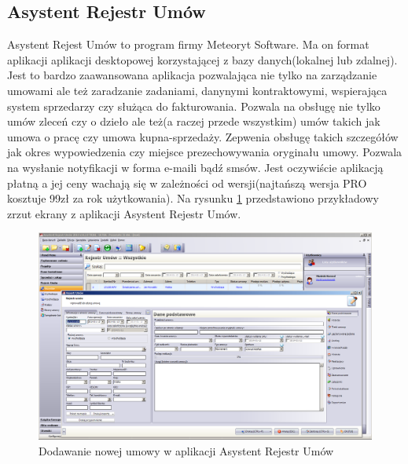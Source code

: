 \subsection[Asystent Rejestr Umów][Asystent Rejestr Umów]{Asystent Rejestr Umów}
Asystent Rejest Umów to program firmy Meteoryt Software. Ma on format aplikacji aplikacji desktopowej korzystającej z bazy danych(lokalnej lub zdalnej). Jest to bardzo zaawansowana aplikacja pozwalająca nie tylko na zarządzanie umowami ale też zaradzanie zadaniami, danynymi kontraktowymi, wspierająca system sprzedarzy czy służąca do fakturowania. Pozwala na obsługę nie tylko umów zleceń czy o dzieło ale też(a raczej przede wszystkim) umów takich jak umowa o pracę czy umowa kupna-sprzedaży. Zepwenia obsługę takich szczegółów jak okres wypowiedzenia czy miejsce prezechowywania oryginału umowy. Pozwala na wysłanie notyfikacji w forma e-maili bądź smsów. Jest oczywiście aplikacją płatną a jej ceny wachają się w zależności od wersji(najtańszą wersja PRO kosztuje 99zł za rok użytkowania). Na rysunku \ref{asystent-rejestr-umow} przedstawiono przykładowy zrzut ekrany z aplikacji Asystent Rejestr Umów.

\begin{figure}[tdh]
    \begin{center}
	\includegraphics[scale=.6, angle=-90]{img/asystent-rejestr-umow.png}
	\caption{Dodawanie nowej umowy w aplikacji Asystent Rejestr Umów}
	\label{asystent-rejestr-umow}
    \end{center}
\end{figure}
